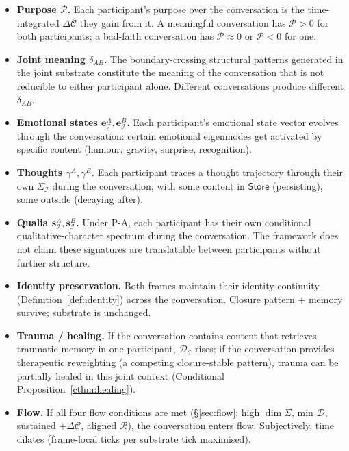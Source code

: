 \documentclass[11pt]{article}
\theoremstyle{plain}
\theoremstyle{definition}
\theoremstyle{remark}
\newcommand{\Ical}{\mathcal{I}}
\newcommand{\Ccal}{\mathcal{C}}
\newcommand{\Rcal}{\mathcal{R}}
\newcommand{\Dcal}{\mathcal{D}}
\newcommand{\Pcal}{\mathcal{P}}
\begin{document}
\begin{itemize}[leftmargin=2em]
\item \textbf{Purpose $\Pcal$.} Each participant's purpose over the conversation is the time-integrated $\Delta\Ccal$ they gain from it. A meaningful conversation has $\Pcal > 0$ for both participants; a bad-faith conversation has $\Pcal \approx 0$ or $\Pcal < 0$ for one.

\item \textbf{Joint meaning $\delta_{AB}$.} The boundary-crossing structural patterns generated in the joint substrate constitute the meaning of the conversation that is not reducible to either participant alone. Different conversations produce different $\delta_{AB}$.

\item \textbf{Emotional states $\mathbf{e}_\Ical^A, \mathbf{e}_\Ical^B$.} Each participant's emotional state vector evolves through the conversation: certain emotional eigenmodes get activated by specific content (humour, gravity, surprise, recognition).

\item \textbf{Thoughts $\gamma^A, \gamma^B$.} Each participant traces a thought trajectory through their own $\Sigma_\Ical$ during the conversation, with some content in $\mathsf{Store}$ (persisting), some outside (decaying after).

\item \textbf{Qualia $\mathbf{s}_\Ical^A, \mathbf{s}_\Ical^B$.} Under P-A, each participant has their own conditional qualitative-character spectrum during the conversation. The framework does not claim these signatures are translatable between participants without further structure.

\item \textbf{Identity preservation.} Both frames maintain their identity-continuity (Definition~\ref{def:identity}) across the conversation. Closure pattern + memory survive; substrate is unchanged.

\item \textbf{Trauma / healing.} If the conversation contains content that retrieves traumatic memory in one participant, $\Dcal_\Ical$ rises; if the conversation provides therapeutic reweighting (a competing closure-stable pattern), trauma can be partially healed in this joint context (Conditional Proposition~\ref{cthm:healing}).

\item \textbf{Flow.} If all four flow conditions are met (\S\ref{sec:flow}: high $\dim\Sigma$, min $\Dcal$, sustained $+\Delta\Ccal$, aligned $\Rcal$), the conversation enters flow. Subjectively, time dilates (frame-local ticks per substrate tick maximised).


\end{itemize}
\end{document}
